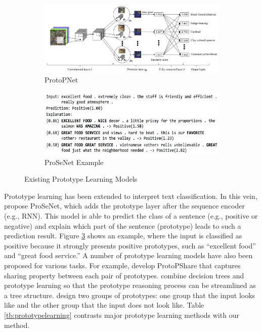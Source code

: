 \documentclass[mnsc]{informs3b} %
\begin{document}
\begin{figure}[H]
\centering
\begin{subfigure}{0.45\textwidth}
    \includegraphics[width=\textwidth]{imgs/ProtoPNet.png}
    \caption{ProtoPNet \citep{chen_this_2019}}
    \label{fig:ProtoPNet}
\end{subfigure}
\hfill
\begin{subfigure}{0.45\textwidth}
    \includegraphics[width=\textwidth]{imgs/ProSeNet.png}
    \caption{ProSeNet Example \citep{ming_interpretable_2019}}
    \label{fig:ProSeNet}
\end{subfigure}
\caption{Existing Prototype Learning Models}
\end{figure}

Prototype learning has been extended to interpret text classification. In this vein, \cite{ming_interpretable_2019} propose ProSeNet, which adds the prototype layer after the sequence encoder (e.g., RNN). This model is able to predict the class of a sentence (e.g., positive or negative) and explain which part of the sentence (prototype) leads to such a prediction result. 
Figure \ref{fig:ProSeNet} shows an example, where the input is classified as positive because it strongly presents positive prototypes, such as ``excellent food'' and ``great food service.''
A number of prototype learning models have also been proposed for various tasks. For example, \cite{rymarczyk_protopshare_2021} develop ProtoPShare that captures sharing property between each pair of prototypes. \cite{nauta_neural_2021} combine decision trees and prototype learning so that the prototype reasoning process can be streamlined as a tree structure. \cite{singh_these_2021} design two groups of prototypes: one group that the input looks like and the other group that the input does not look like. Table \ref{tb:prototypelearning} contrasts major prototype learning methods with our method.
\end{document}

